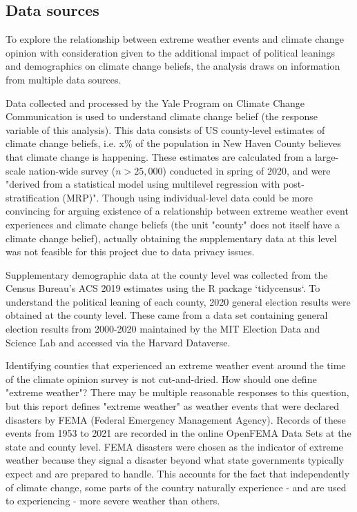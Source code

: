 \documentclass{article}
\begin{document}
\subsection{Data sources}
To explore the relationship between extreme weather events and climate
change opinion with consideration given to the additional impact of
political leanings and demographics on climate change beliefs, the analysis
draws on information from multiple data sources. 

Data collected and processed by the Yale Program on Climate Change
Communication is used to understand climate change belief (the response
variable of this analysis). This data consists of US
county-level estimates of climate change beliefs, i.e. x\% of the population
in New Haven County believes that climate change is happening. These
estimates are calculated from a large-scale nation-wide survey ($n > 25,000$)
conducted in spring of 2020, and were "derived from a statistical model using
multilevel regression with post-stratification (MRP)". Though using
individual-level data could be more convincing for arguing existence of a
relationship between extreme weather event experiences and climate change
beliefs (the unit "county" does not itself have a climate change belief),
actually obtaining the supplementary data at this level was not feasible for
this project due to data privacy issues. 

Supplementary demographic data at the county level was collected from the Census
Bureau's ACS 2019 estimates using the R package `tidycensus`. To understand
the political leaning of each county, 2020 general election results were obtained
at the county level. These came from a data set containing general election
results from 2000-2020 maintained by the MIT Election Data and Science Lab
and accessed via the Harvard Dataverse. 

Identifying counties that experienced an extreme weather event around the
time of the climate opinion survey is not cut-and-dried. How should one
define "extreme weather"? There may be multiple reasonable responses
to this question, but this report defines "extreme weather" as
weather events that were declared disasters by FEMA
(Federal Emergency Management Agency). Records of these events from 1953 to
2021 are recorded in the online OpenFEMA Data Sets at the state and county level.
FEMA disasters were chosen as the indicator of extreme weather because
they signal a disaster beyond what state governments typically expect and are
prepared to handle. This accounts for the fact that independently of climate
change, some parts of the country naturally experience - and are used to
experiencing - more severe weather than others.
\end{document}
